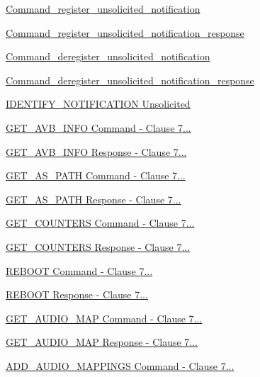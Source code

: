 \begin{DoxyCompactItemize}
\hyperlink{group__command__register__unsolicited__notification}{Command\+\_\+register\+\_\+unsolicited\+\_\+notification}
\item 
\hyperlink{group__command__register__unsolicited__notification__response}{Command\+\_\+register\+\_\+unsolicited\+\_\+notification\+\_\+response}
\item 
\hyperlink{group__command__deregister__unsolicited__notification}{Command\+\_\+deregister\+\_\+unsolicited\+\_\+notification}
\item 
\hyperlink{group__command__deregister__unsolicited__notification__response}{Command\+\_\+deregister\+\_\+unsolicited\+\_\+notification\+\_\+response}
\item 
\hyperlink{group__command__identify__notification}{I\+D\+E\+N\+T\+I\+F\+Y\+\_\+\+N\+O\+T\+I\+F\+I\+C\+A\+T\+I\+O\+N Unsolicited}
\item 
\hyperlink{group__command__get__avb__info}{G\+E\+T\+\_\+\+A\+V\+B\+\_\+\+I\+N\+F\+O Command  -\/ Clause 7...}
\item 
\hyperlink{group__command__get__avb__info__response}{G\+E\+T\+\_\+\+A\+V\+B\+\_\+\+I\+N\+F\+O Response  -\/ Clause 7...}
\item 
\hyperlink{group__command__get__as__path}{G\+E\+T\+\_\+\+A\+S\+\_\+\+P\+A\+T\+H Command  -\/ Clause 7...}
\item 
\hyperlink{group__command__get__as__path__response}{G\+E\+T\+\_\+\+A\+S\+\_\+\+P\+A\+T\+H Response  -\/ Clause 7...}
\item 
\hyperlink{group__command__get__counters}{G\+E\+T\+\_\+\+C\+O\+U\+N\+T\+E\+R\+S Command  -\/ Clause 7...}
\item 
\hyperlink{group__command__get__counters__response}{G\+E\+T\+\_\+\+C\+O\+U\+N\+T\+E\+R\+S Response  -\/ Clause 7...}
\item 
\hyperlink{group__command__reboot}{R\+E\+B\+O\+O\+T Command  -\/ Clause 7...}
\item 
\hyperlink{group__command__reboot__response}{R\+E\+B\+O\+O\+T Response -\/ Clause 7...}
\item 
\hyperlink{group__command__get__audio__map}{G\+E\+T\+\_\+\+A\+U\+D\+I\+O\+\_\+\+M\+A\+P Command  -\/ Clause 7...}
\item 
\hyperlink{group__command__get__audio__map__response}{G\+E\+T\+\_\+\+A\+U\+D\+I\+O\+\_\+\+M\+A\+P Response  -\/ Clause 7...}
\item 
\hyperlink{group__command__add__audio__mappings}{A\+D\+D\+\_\+\+A\+U\+D\+I\+O\+\_\+\+M\+A\+P\+P\+I\+N\+G\+S Command  -\/ Clause 7...}

\end{DoxyCompactItemize}
